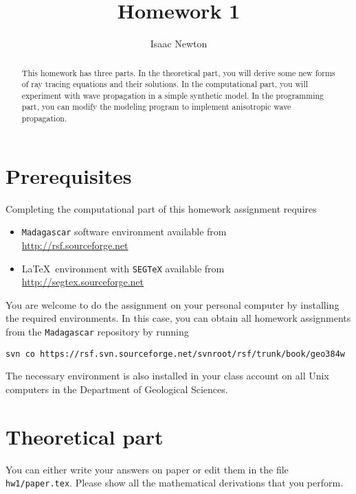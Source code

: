 \author{Isaac Newton} 
\title{Homework 1}


\begin{abstract}
  This homework has three parts. In the theoretical part, you will
  derive some new forms of ray tracing equations and their solutions.
  In the computational part, you will experiment with wave propagation
  in a simple synthetic model.  In the programming part, you can
  modify the modeling program to implement anisotropic wave propagation.
\end{abstract}

\section{Prerequisites}

Completing the computational part of this homework assignment requires
\begin{itemize}
\item \texttt{Madagascar} software environment available from \\
\url{http://rsf.sourceforge.net}
\item \LaTeX\ environment with \texttt{SEGTeX} available from \\ 
\url{http://segtex.sourceforge.net}
\end{itemize}

You are welcome to do the assignment on your personal computer by
installing the required environments. In this case, you can obtain all
homework assignments from the \texttt{Madagascar} repository by running
\begin{verbatim}
svn co https://rsf.svn.sourceforge.net/svnroot/rsf/trunk/book/geo384w 
\end{verbatim}

The necessary environment is also installed in your class account on
all Unix computers in the Department of Geological Sciences.

\section{Theoretical part}

You can either write your answers on paper or edit them in the file
\verb#hw1/paper.tex#. Please show all the mathematical
derivations that you perform.

